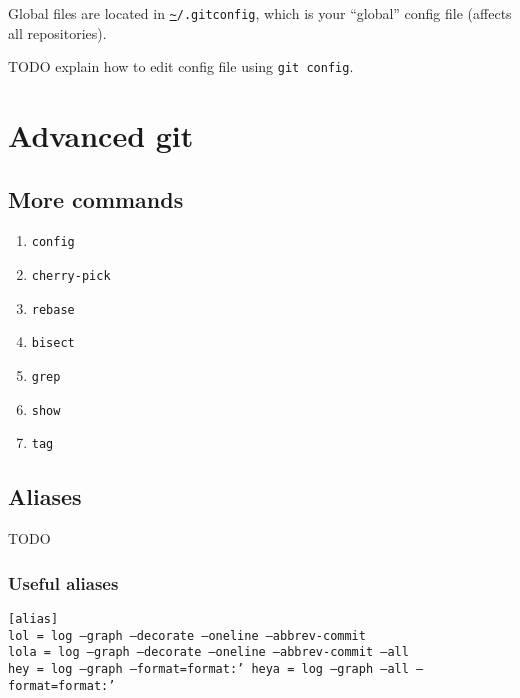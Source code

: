 \documentclass[12pt]{article}
\newcommand{\urlwofont}[1]{\urlstyle{same}\url{#1}}
\begin{document}
Global files are located in \texttt{\urlwofont{~}/.gitconfig}, which is your ``global'' config file (affects all repositories).

TODO explain how to edit config file using \texttt{git config}.

\section{Advanced git}

\subsection{More commands}
\begin{enumerate}

\item{\texttt{config}}

\item{\texttt{cherry-pick}}

\item{\texttt{rebase}}

\item{\texttt{bisect}}

\item{\texttt{grep}}

\item{\texttt{show}}

\item{\texttt{tag}}

\end{enumerate}

\subsection{Aliases}
TODO

\subsubsection{Useful aliases}
\texttt{[alias]\\
lol = log --graph --decorate --oneline --abbrev-commit\\
lola = log --graph --decorate --oneline --abbrev-commit --all\\
hey = log --graph --format=format:'%
heya = log --graph --all --format=format:'%
}
\end{document}
